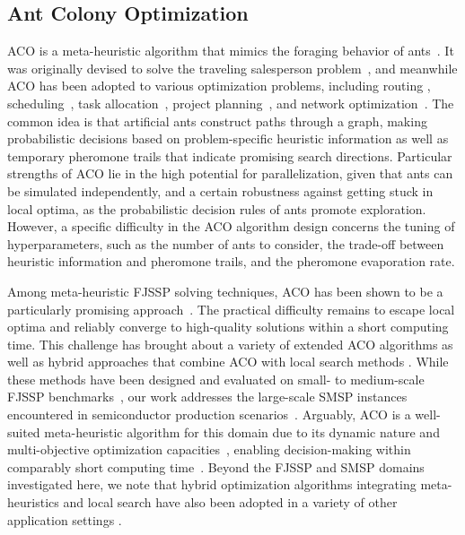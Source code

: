 \subsection{Ant Colony Optimization}
ACO is a %
meta-heuristic algorithm that mimics the foraging behavior of ants~\cite{dorigo2019ant}.
It was originally devised to solve the traveling salesperson problem~\cite{stutzle1999aco}, %
and meanwhile ACO has been adopted to various optimization problems, including routing \cite{rizzoli2007ant}, scheduling~\cite{luo2008ant}, task allocation~\cite{rugwiro2019task}, project planning~\cite{khelifa2020holonic}, and network optimization~\cite{wang2009hopnet}.
The common idea is that artificial ants construct paths through a graph,
making probabilistic decisions based on problem-specific heuristic information as well as temporary pheromone trails that indicate
promising search directions.
Particular strengths of ACO lie in the high potential for parallelization,
given that ants can be simulated independently,
and a certain robustness against getting stuck in local optima,
as the probabilistic decision rules of ants promote exploration.
However, a specific difficulty in the ACO algorithm design concerns the
tuning of hyperparameters, such as the number of ants to consider,
the trade-off between heuristic information and pheromone trails, and
the pheromone evaporation rate.

Among meta-heuristic FJSSP solving techniques,
ACO has been shown to be a particularly promising approach~\cite{turkyilmaz2020research}.
The practical difficulty remains to escape local optima and reliably
converge to high-quality solutions within a short computing time.
This challenge has brought about a variety of extended ACO algorithms as well as
hybrid approaches that combine ACO with local search methods
\cite{leung2010integrated,li2010improved,xing2010knowledge,thammano2013hybrid,arnaout2014two,el2017dual}.
While these methods have been designed and evaluated
on small- to medium-scale FJSSP benchmarks~\cite{arnaout2014two},
our work addresses the large-scale SMSP instances encountered in
semiconductor production scenarios~\cite{kopp2020smt2020}.
Arguably, ACO is a well-suited meta-heuristic algorithm for this domain
due to its dynamic nature and multi-objective optimization capacities~\cite{nayar2021ant}, enabling decision-making within comparably short computing time~\cite{zhou2022parameter}.
Beyond the FJSSP and SMSP domains investigated here,
we note that hybrid optimization algorithms integrating meta-heuristics and
local search have also been adopted in a variety of other application settings
\cite{abdel2021hybrid,fontes2023hybrid,li2021hybrid,mohd2023improved,suid2023novel}.

